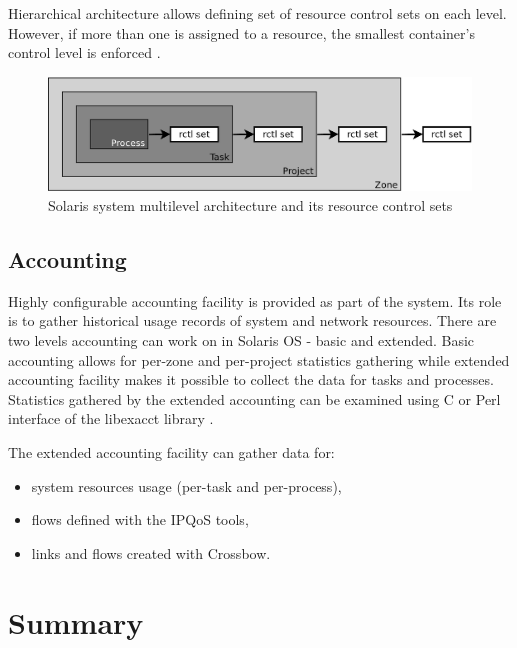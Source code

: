 \documentclass[11pt,openany]{book}
\begin{document}
      Hierarchical architecture allows defining set of resource control sets on each level. However, if more than one is
      assigned to a resource, the smallest container's control level is enforced \cite{oracle_admin_guide}. 

      \begin{figure}[H]
        \centering
        \includegraphics[width=.7\textwidth]{img/solaris/multi.pdf}

        \caption{Solaris system multilevel architecture and its resource control sets}
		  \end{figure}


      \subsection{Accounting}
      \label{sub:sol:acct}

        Highly configurable accounting facility is provided as part of the system. Its role is to gather historical
        usage records of system and network resources. There are two levels accounting can work on in Solaris
        OS - basic and extended. Basic accounting allows for per-zone and per-project statistics gathering while
        extended accounting facility makes it possible to collect the data for tasks and processes. Statistics gathered
        by the extended accounting can be examined using C or Perl interface of the libexacct library \cite{sag}.

        The extended accounting facility can gather data for:

        \begin{itemize}
          \item system resources usage (per-task and per-process),
          \item flows defined with the IPQoS tools,
          \item links and flows created with Crossbow.
        \end{itemize}


    \section*{Summary}
\end{document}
